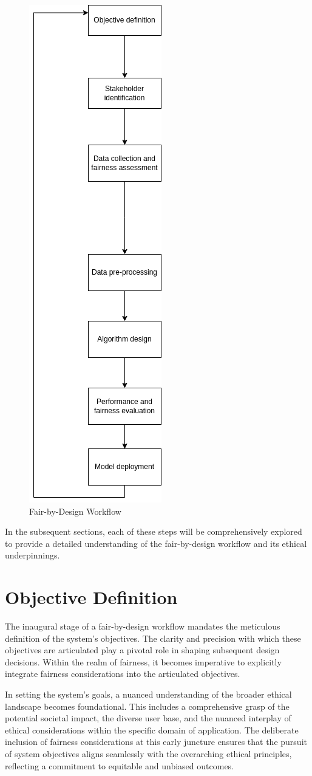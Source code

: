 \begin{figure}[hp]
    \centering
    \includegraphics[width=.5\textwidth,height=1\textwidth]{final.png}
    \caption{Fair-by-Design Workflow}
\end{figure}

In the subsequent sections, each of these steps will be comprehensively explored to provide a detailed understanding of the fair-by-design workflow and its ethical underpinnings.

\section{Objective Definition}
\label{section:objective-definition}

The inaugural stage of a fair-by-design workflow mandates the meticulous definition of the system's objectives. The clarity and precision with which these objectives are articulated play a pivotal role in shaping subsequent design decisions. Within the realm of fairness, it becomes imperative to explicitly integrate fairness considerations into the articulated objectives.

In setting the system's goals, a nuanced understanding of the broader ethical landscape becomes foundational. This includes a comprehensive grasp of the potential societal impact, the diverse user base, and the nuanced interplay of ethical considerations within the specific domain of application. The deliberate inclusion of fairness considerations at this early juncture ensures that the pursuit of system objectives aligns seamlessly with the overarching ethical principles, reflecting a commitment to equitable and unbiased outcomes.


